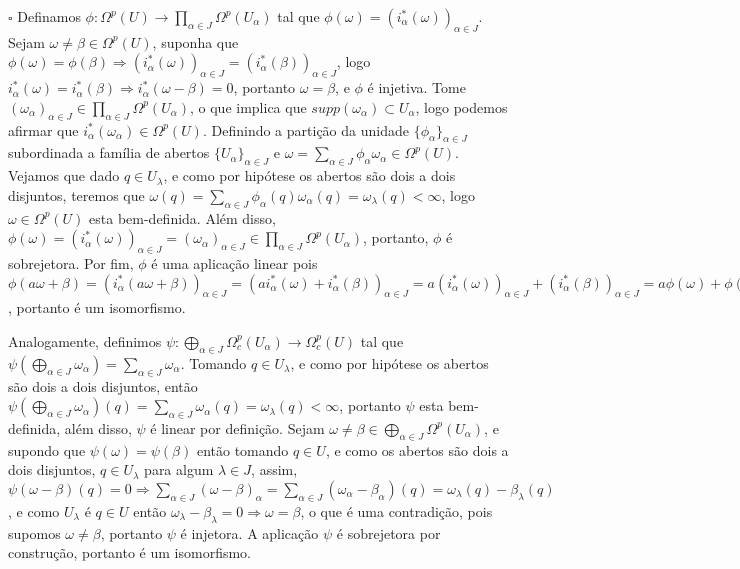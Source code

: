 \documentclass{article}
\begin{document}
	$\square$ Definamos $\phi: \Omega^{p}(U) \to \prod_{\alpha \in J} \Omega^{p}({U_{\alpha}})$ tal que $\phi(\omega) = (i^{*}_{\alpha}(\omega))_{\alpha \in J}$. Sejam $\omega \neq \beta \in \Omega^{p}(U) $, suponha que $\phi(\omega) =\phi(\beta) \Rightarrow (i^{*}_{\alpha}(\omega))_{\alpha \in J}=(i^{*}_{\alpha}(\beta))_{\alpha \in J}$, logo $i^{*}_{\alpha}(\omega)=i^{*}_{\alpha}(\beta) \Rightarrow i^{*}_{\alpha}(\omega -\beta) = 0$, portanto $\omega = \beta$, e $\phi$ é injetiva. Tome $(\omega_{\alpha})_{\alpha \in J} \in  \prod_{\alpha \in J} \Omega^{p}({U_{\alpha}})$, o que implica que $supp(\omega_{\alpha}) \subset U_{\alpha}$, logo podemos afirmar que $i^{*}_{\alpha}(\omega_{\alpha}) \in \Omega^{p}(U)$. Definindo a partição da unidade $\{\phi_{\alpha} \}_{\alpha \in J}$ subordinada a família de abertos $\{U_{\alpha}\}_{\alpha \in J}$ e $\omega = \sum_{\alpha \in J}\phi_{\alpha}\omega_{\alpha} \in \Omega^{p}(U)$. Vejamos que dado $ q \in U_{\lambda} $, e como por hipótese os abertos são dois a dois disjuntos, teremos que $\omega(q) = \sum_{\alpha \in J}\phi_{\alpha}(q)\omega_{\alpha}(q) = \omega_{\lambda}(q) < \infty$, logo $\omega \in \Omega^{p}(U)$ esta bem-definida. Além disso, $\phi(\omega) = (i^{*}_{\alpha}(\omega))_{\alpha \in J} = (\omega_{\alpha})_{\alpha \in J} \in \prod_{\alpha \in J} \Omega^{p}({U_{\alpha}})$, portanto, $\phi$ é sobrejetora. Por fim, $\phi$ é uma aplicação linear pois $\phi(a\omega + \beta) = (i^{*}_{\alpha}(a\omega+\beta))_{\alpha \in J}=(ai^{*}_{\alpha}(\omega)+i^{*}_{\alpha}(\beta))_{\alpha \in J} = a(i^{*}_{\alpha}(\omega))_{\alpha \in J} + (i^{*}_{\alpha}(\beta))_{\alpha \in J} = a\phi(\omega)+\phi(\beta)$, portanto é um isomorfismo.
	
	Analogamente, definimos $\psi: \bigoplus_{\alpha \in J} \Omega^{p}_{c}(U_{\alpha}) \to \Omega^{p}_{c}(U)$ tal que $\psi(\bigoplus_{\alpha \in J}\omega_{\alpha}) = \sum_{\alpha \in J}\omega_{\alpha}$. Tomando $q \in U_{\lambda}$, e como por hipótese os abertos são dois a dois disjuntos, então $\psi(\bigoplus_{\alpha \in J}\omega_{\alpha})(q) = \sum_{\alpha \in J}\omega_{\alpha}(q) = \omega_{\lambda}(q) < \infty$, portanto $\psi$ esta bem-definida, além disso, $\psi$ é linear por definição. Sejam $\omega \neq \beta \in \bigoplus_{\alpha \in J} \Omega^{p}(U_{\alpha})$, e supondo que $\psi(\omega) = \psi(\beta)$ então tomando $q \in U$, e como os abertos são dois a dois disjuntos, $q \in U_{\lambda}$ para algum $\lambda \in J$, assim, $\psi(\omega - \beta)(q) = 0 \Rightarrow \sum_{\alpha \in J}(\omega - \beta)_{\alpha} = \sum_{\alpha \in J}(\omega_{\alpha} - \beta_{\alpha})(q) = \omega_{\lambda}(q) - \beta_{\lambda}(q)$, e como $U_{\lambda}$ é $q \in U$ então $\omega_{\lambda} - \beta_{\lambda} = 0 \Rightarrow \omega = \beta$, o que é uma contradição, pois supomos $\omega \neq \beta$, portanto $\psi$ é injetora. A aplicação $\psi$ é sobrejetora por construção, portanto é um isomorfismo.
	
\end{document}
